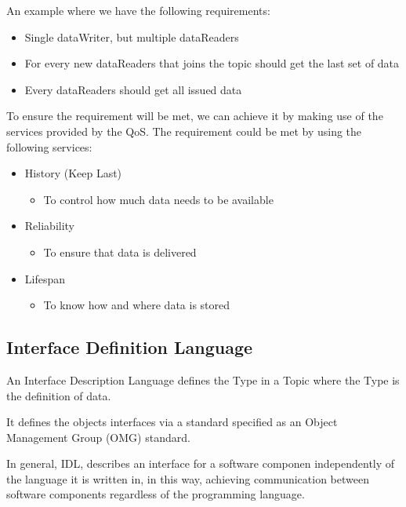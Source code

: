An example where we have the following requirements:

\begin{itemize}
\item Single dataWriter, but multiple dataReaders
\item For every new dataReaders that joins the topic should get the last set of data
\item Every dataReaders should get all issued data
\end{itemize}

To ensure the requirement will be met, we can achieve it by making use of the services provided by the QoS. The requirement could be met by using the following services:

\begin{itemize}
\item History (Keep Last)
\begin{itemize}
\item To control how much data needs to be available
\end{itemize}
\item Reliability
\begin{itemize}
\item To ensure that data is delivered
\end{itemize}
\item Lifespan
\begin{itemize}
\item To know how and where data is stored
\end{itemize}
\end{itemize}

\subsection{Interface Definition Language}
An Interface Description Language defines the Type in a Topic where the Type is the definition of data.

It defines the objects interfaces via a standard specified as an Object Management Group (OMG) standard.

In general, IDL, describes an interface for a software componen independently of the language it is written in, in this way, achieving communication between software components regardless of the programming language.




